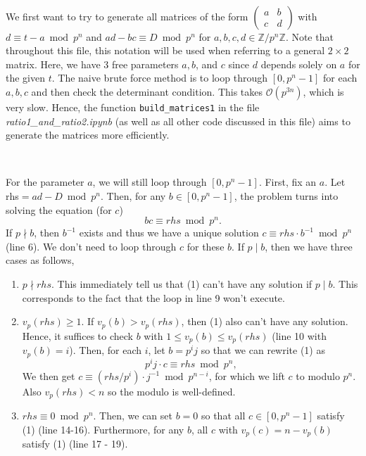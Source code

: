 \documentclass[letterpaper,12pt]{article}
\newcommand{\Z}{\mathbb{Z}}
\newcommand{\bigO}{\mathcal{O}}
\begin{document}
\

We first want to try to generate all matrices of the form 
$\begin{pmatrix} a & b \\ c & d \end{pmatrix}$
with $d \equiv t - a \bmod p^n$ and $ad - bc \equiv D \bmod p^n$ 
for $a,b,c,d \in \Z/p^n\Z$.
Note that throughout this file, this notation will be used when referring to a general $2\times2$ matrix.
Here, we have 3 free parameters $a,b$, and $c$ since $d$ depends solely on $a$ for the given $t$.
The naive brute force method is to loop
through $[0, p^n-1]$ for each $a,b,c$ and then check the determinant condition.
This takes $\bigO(p^{3n})$, which is very slow.
Hence, the function \texttt{build\_matrices1} in the file 
\emph{ratio1\_and\_ratio2.ipynb} (as well as all other code discussed in this file) aims to 
generate the matrices more efficiently.

\

For the parameter $a$, we will still loop through $[0, p^n-1]$.
First, fix an $a$.
Let rhs$ = ad-D \bmod p^n$.
Then, for any $b \in [0, p^n-1]$,
the problem turns into solving the equation (for $c$)
\begin{equation}
bc \equiv rhs \bmod p^n .
\end{equation}
If $p \nmid b$, then $b^{-1}$ exists and thus 
we have a unique solution
$c \equiv rhs \cdot b^{-1} \bmod p^n$ (line 6).
We don't need to loop through $c$ for these $b$.
If $p \mid b$, then we have three cases as follows,

\begin{enumerate}
\item $p \nmid rhs$. This immediately tell us that (1) can't have any solution 
if $p \mid b$. This corresponds to the fact that the loop in line 9 won't execute.

\item $v_p(rhs) \geq 1$.
If $v_p(b) > v_p(rhs)$, then (1) also can't have any solution.
Hence, it suffices to check $b$ with $1 \leq v_p(b) \leq v_p(rhs)$ (line 10 with $v_p(b) = i$).
Then, for each $i$, let $b = p^i j$ so that we can rewrite (1) as 
\[
p^i j \cdot c \equiv rhs \bmod p^n,
\]
We then get $c \equiv (rhs / p^i) \cdot j^{-1} \bmod p^{n-i}$, 
for which we lift $c$ to modulo $p^n$.
Also $v_p(rhs) < n$ so the modulo is well-defined.

\item $rhs \equiv 0 \bmod p^n$.
Then, we can set $b=0$ so that all $c \in [0, p^n-1]$ satisfy (1) (line 14-16).
Furthermore, for any $b$, 
all $c$ with $v_p(c) = n-v_p(b)$ satisfy (1) (line 17 - 19). 
\end{enumerate}
\end{document}
